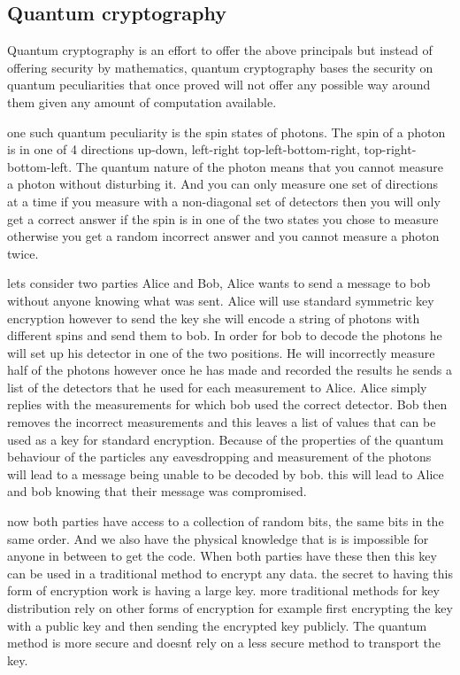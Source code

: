 \documentclass[12pt]{article}
\begin{document}
\subsection{Quantum cryptography}
Quantum cryptography is an effort to offer the above principals but instead
of offering security by mathematics, quantum cryptography bases the security
on quantum peculiarities that once proved will not offer any possible way
around them given any amount of computation available.

one such quantum peculiarity is the spin states of photons. The spin of
a photon is in one of 4 directions up-down, left-right top-left-bottom-right, 
top-right-bottom-left. The quantum nature of the photon means that you cannot measure a photon
without disturbing it. And you can only measure one set of directions at a time
if you measure with a non-diagonal set of detectors then you will only get 
a correct answer if the spin is in one of the two states you chose to measure
otherwise you get a random incorrect answer and you cannot measure a photon
twice.

lets consider two parties Alice and Bob, Alice wants to send a message to
bob without anyone knowing what was sent.
Alice will use standard symmetric key encryption however to send the key
she will encode a string of photons with different spins and send them to
bob. In order for bob to decode the photons he will set up his detector 
in one of the two positions. He will incorrectly measure half of the photons
however once he has made and recorded the results he sends a list of the
detectors that he used for each measurement to Alice. Alice simply replies
with the measurements for which bob used the correct detector. Bob then 
removes the incorrect measurements and this leaves a list of values that 
can be used as a key for standard encryption. Because of the properties
of the quantum behaviour of the particles any eavesdropping and measurement
of the photons will lead to a message being unable to be decoded by bob.
this will lead to Alice and bob knowing that their message was compromised.

now both parties have access to a collection of random bits, the same bits
in the same order. And we also have the physical knowledge that is is
impossible for anyone in between to get the code. When both parties have
these then this key can be used in a traditional method to encrypt any data.
the secret to having this form of encryption work is having a large key.
more traditional methods for key distribution rely on other forms of encryption
for example first encrypting the key with a public key and then sending 
the encrypted key publicly. The quantum method is more secure and doesn\'t
rely on a less secure method to transport the key.
\end{document}
